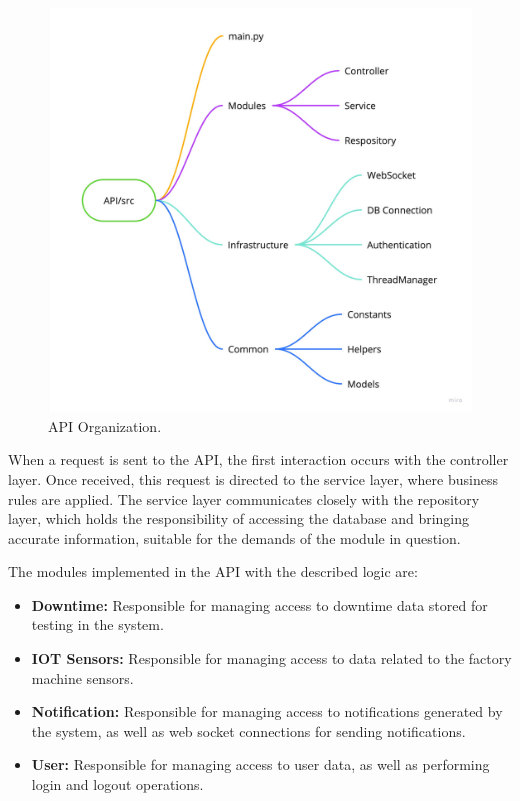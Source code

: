 \begin{figure}[htbp]
	\centering
	\includegraphics[width=\textwidth]{images/API_Organization.jpg}
	\caption{API Organization.}
	\label{fig:api_organization}
\end{figure}

When a request is sent to the \gls{API}, the first interaction occurs with the controller layer. Once received, this request is directed to the service layer, where business rules are applied. The service layer communicates closely with the repository layer, which holds the responsibility of accessing the database and bringing accurate information, suitable for the demands of the module in question.

The modules implemented in the \gls{API} with the described logic are:
\begin{itemize}
	\item \textbf{Downtime:} Responsible for managing access to downtime data stored for testing in the system.
	\item \textbf{IOT Sensors:} Responsible for managing access to data related to the factory machine sensors.
	\item \textbf{Notification:} Responsible for managing access to notifications generated by the system, as well as web socket connections for sending notifications.
	\item \textbf{User:} Responsible for managing access to user data, as well as performing login and logout operations. 
\end{itemize}

